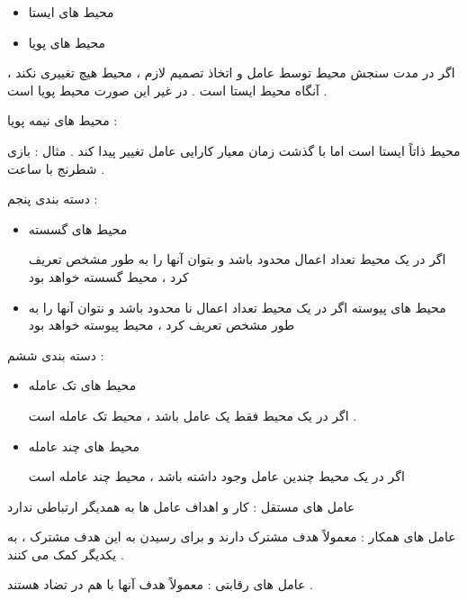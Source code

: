\documentclass[12pt]{article}
\begin{document}
\begin{itemize}
	\item محیط های ایستا
	\item محیط های پویا
\end{itemize}

\noindent
اگر در مدت سنجش محیط توسط عامل و اتخاذ تصمیم لازم ، محیط هیچ تغییری نکند ، آنگاه محیط ایستا است . در غیر این صورت محیط پویا است .

\noindent
محیط های نیمه پویا :

\noindent
محیط ذاتاً ایستا است اما با گذشت زمان معیار کارایی عامل تغییر پیدا کند . مثال : بازی شطرنج با ساعت .



\vspace{10pt}


\noindent
دسته بندی پنجم :

\begin{itemize}
	\item محیط های گسسته
	
	اگر در یک محیط تعداد اعمال محدود باشد و بتوان آنها را به طور مشخص تعریف کرد ، محیط گسسته خواهد بود 
	\item محیط های پیوسته
	اگر در یک محیط تعداد اعمال نا محدود باشد و نتوان آنها را به طور مشخص تعریف کرد ، محیط پیوسته خواهد بود 
\end{itemize}




\vspace{10pt}


\noindent
دسته بندی ششم :

\begin{itemize}
	\item محیط های تک عامله 
	
	اگر در یک محیط فقط یک عامل باشد ، محیط تک عامله  است .
	\item محیط های چند عامله
	
	اگر در یک محیط چندین عامل وجود داشته باشد ، محیط چند عامله است
\end{itemize}





\vspace{30pt}


\begin{tcolorbox}
عامل های مستقل : 
کار و اهداف عامل ها به همدیگر ارتباطی ندارد

\vspace{10pt}

عامل های همکار : 
معمولاً هدف مشترک دارند و برای رسیدن به این هدف مشترک ، به یکدیگر کمک می کنند .

\vspace{10pt}

عامل های رقابتی :
معمولاً هدف آنها با هم در تضاد هستند .
\end{tcolorbox}
\end{document}
